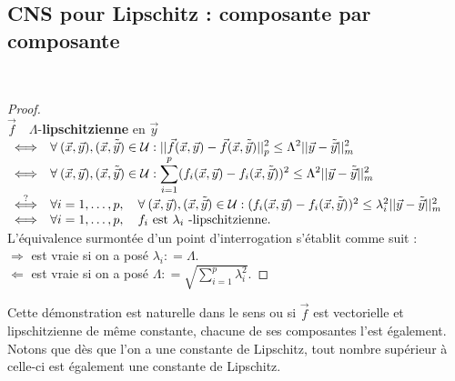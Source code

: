 	
\setcounter{subsection}{3}
\subsection{CNS pour Lipschitz : composante par composante}
\ 
\begin{proof}\ \\
	$\vec f \quad \Lambda$-{\bf lipschitzienne}  en $\vec y$
	\\
	$
	\begin{array}{ll}
		\Longleftrightarrow               & {\displaystyle \forall \: (\vec x , \vec y ) , 
		(\vec x, \tilde{\vec y} ) \in {\cal U} : || \vec f (\vec x, \vec y
		) - \vec f ( \vec x , \tilde{\vec y} ) ||_p ^2 \leq \Lambda ^2 ||
		\vec y - \tilde{\vec y} ||^2 _m }\\
		\Longleftrightarrow               & {\displaystyle \forall \: (\vec x , \vec y )   
		, (\vec x, \tilde{\vec y} ) \in {\cal U} : \sum^p _{i=1} (  f_i
		(\vec x, \vec y) -  f_i ( \vec x , \tilde{\vec y} ) )^2  \leq
		\Lambda ^2 || \vec y - \tilde{\vec y} ||^2 _m } \\
		\stackrel{?}{\Longleftrightarrow} & \forall i = 1 , \ldots , p,                    
		\quad \forall \: (\vec x , \vec y ) , (\vec x, \tilde{\vec y} )
		\in {\cal U} : (f_i (\vec x, \vec y) - f_i ( \vec x , \tilde{\vec
		y} ) )^2  \leq \lambda ^2 _i || \vec y - \tilde{\vec y}
		||^2 _m \\
		\Longleftrightarrow               & \forall i = 1 , \ldots , p , \quad f_i         
		\mbox{ est } \lambda_i  \mbox{ -lipschitzienne.}
		
	\end{array}
	$ \\
	
	L'équivalence surmontée d'un point d'interrogation
	s'établit comme suit : \\
	
	$\Longrightarrow$ est vraie si on a posé $\lambda_i : = \Lambda
	$. \\
	
	$ \Longleftarrow $ est vraie si on a posé ${\displaystyle
		\Lambda : = \sqrt{\sum_{i=1}^{p} \lambda^2 _i}}$. 
\end{proof}
Cette démonstration est naturelle dans le sens ou si $\vec{f}$ est vectorielle 
et lipschitzienne de même constante, chacune de ses composantes l'est également. 
Notons que dès que l'on a une constante de Lipschitz, tout nombre supérieur à 
celle-ci est également une constante de Lipschitz.
	
